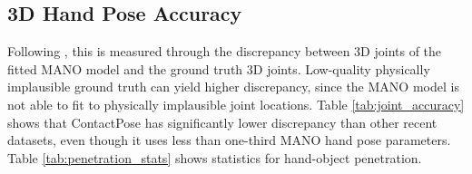 \documentclass[runningheads]{llncs}
\begin{document}
\subsection{3D Hand Pose Accuracy}
Following \cite{hampali2019ho}, this is measured through the discrepancy between 3D joints of the fitted MANO model and the ground truth 3D joints. Low-quality physically implausible ground truth can yield higher discrepancy, since the MANO model is not able to fit to physically implausible joint locations. Table \ref{tab:joint_accuracy} shows that ContactPose has significantly lower discrepancy than other recent datasets, even though it uses less than one-third MANO hand pose parameters. Table \ref{tab:penetration_stats} shows statistics for hand-object penetration.
\begin{table}
    \centering
    \caption{Discrepancy between 3D joints of the fitted MANO model and the ground truth 3D joints. 3D joint error (lower is better) is averaged over all 21 joints. AUC (higher is better) is the area under the error threshold vs. percentage of correct keypoints (PCK) curve, where the maximum error threshold is set to 5 cm.}
    \label{tab:joint_accuracy}
\end{table}
\end{document}
